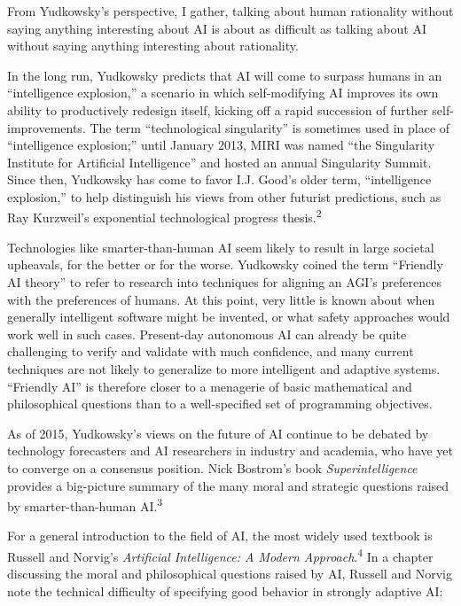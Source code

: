 {
 From Yudkowsky's perspective, I gather, talking
about human rationality without saying anything interesting about AI is
about as difficult as talking about AI without saying anything
interesting about rationality.}

{
 In the long run, Yudkowsky predicts that AI will come to surpass
humans in an ``intelligence
explosion,'' a scenario in which self-modifying AI
improves its own ability to productively redesign itself, kicking off a
rapid succession of further self-improvements. The term
``technological singularity'' is
sometimes used in place of ``intelligence
explosion;'' until January 2013, MIRI was named
``the Singularity Institute for Artificial
Intelligence'' and hosted an annual Singularity
Summit. Since then, Yudkowsky has come to favor I.J.
Good's older term, ``intelligence
explosion,'' to help distinguish his views from other
futurist predictions, such as Ray Kurzweil's
exponential technological progress thesis.\textsuperscript{2}}

{
 Technologies like smarter-than-human AI seem likely to result in
large societal upheavals, for the better or for the worse. Yudkowsky
coined the term ``Friendly AI
theory'' to refer to research into techniques for
aligning an AGI's preferences with the preferences of
humans. At this point, very little is known about when generally
intelligent software might be invented, or what safety approaches would
work well in such cases. Present-day autonomous AI can already be quite
challenging to verify and validate with much confidence, and many
current techniques are not likely to generalize to more intelligent and
adaptive systems. ``Friendly AI'' is
therefore closer to a menagerie of basic mathematical and philosophical
questions than to a well-specified set of programming objectives.}

{
 As of 2015, Yudkowsky's views on the future of AI
continue to be debated by technology forecasters and AI researchers in
industry and academia, who have yet to converge on a consensus
position. Nick Bostrom's book
\textit{Superintelligence} provides a big-picture summary of the many
moral and strategic questions raised by smarter-than-human
AI.\textsuperscript{3}}

{
 For a general introduction to the field of AI, the most widely
used textbook is Russell and Norvig's
\textit{Artificial Intelligence: A Modern Approach}.\textsuperscript{4}
In a chapter discussing the moral and philosophical questions raised by
AI, Russell and Norvig note the technical difficulty of specifying good
behavior in strongly adaptive AI:}

